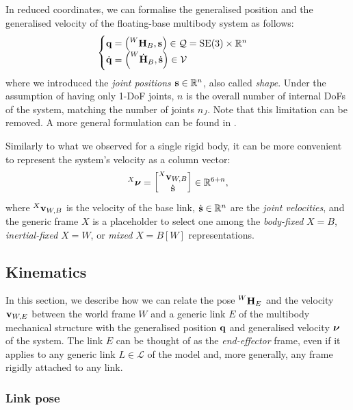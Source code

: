 In reduced coordinates, we can formalise the generalised position and the generalised velocity of the floating-base multibody system as follows:
%
\begin{equation}
\label{eq:floating_base_position}
    \begin{cases}
        \Qu = \left(\homo[W]_B, \Shape\right) \in \mathcal{Q} = \SE(3) \times \realn^n \\
        \Qud = \left(\homod[W]_B, \Shaped\right) \in \mathcal{V}
    \end{cases}
\end{equation}
%
where we introduced the \emph{joint positions} $\Shape \in \realn^n$, also called \emph{shape}.
Under the assumption of having only 1-\ac{DoF} joints, $n$ is the overall number of internal \aclp{DoF} of the system, matching the number of joints $n_J$.
Note that this limitation can be removed.
A more general formulation can be found in \parencite{featherstone_rigid_2008}.

Similarly to what we observed for a single rigid body, it can be more convenient to represent the system's velocity as a column vector:
%
\begin{equation}
\label{eq:floating_base_velocity}
    \Nu[X] =
    \begin{bmatrix}
        \velsix[X]_{W,B} \\ \Shaped
    \end{bmatrix}
    \in \realn^{6+n}
    ,
\end{equation}
%
where $\velsix[X]_{W,B}$ is the velocity of the base link, $\Shaped \in \realn^n$ are the \emph{joint velocities}, and the generic frame $X$ is a placeholder to select one among the \emph{body-fixed} $X=B$, \emph{inertial-fixed} $X=W$, or \emph{mixed} $X=B[W]$ representations.

\subsection{Kinematics}

In this section, we describe how we can relate the pose $\homo[W]_E$ and the velocity $\velsix_{W,E}$ between the world frame $W$ and a generic link $E$ of the multibody mechanical structure with the generalised position $\Qu$ and generalised velocity $\Nu$ of the system.
The link $E$ can be thought of as the \emph{end-effector} frame, even if it applies to any generic link $L \in \mathcal{L}$ of the model and, more generally, any frame rigidly attached to any link.

\subsubsection{Link pose}

